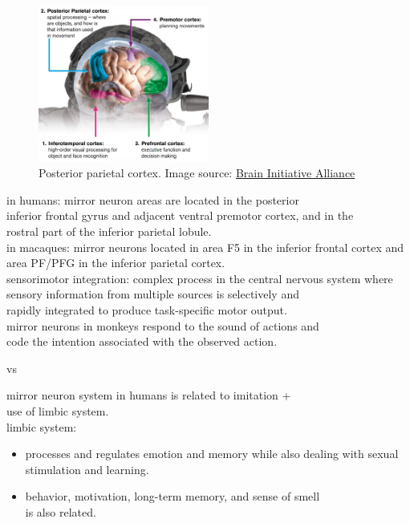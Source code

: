 \documentclass[12pt]{article}
\begin{document}
\begin{figure}[ht]
    \centering
    \includegraphics[width=0.5\textwidth]{brain2.png} %
    \caption{Posterior parietal cortex. Image source: \href{https://www.braininitiative.org/wp-content/uploads/2017/08/Posterior-Parietal-Cortex-170726.jpg}{Brain Initiative Alliance}}
    \label{fig:post}
\end{figure}

\noindent in humans: mirror neuron areas are located in the posterior\\inferior frontal gyrus and adjacent ventral premotor cortex, and in the\\rostral part of the inferior parietal lobule.\\

\noindent in macaques: mirror neurons located in area F5 in the inferior frontal cortex and area PF/PFG in the inferior parietal cortex.\\

\noindent sensorimotor integration: complex process in the central nervous system where sensory information from multiple sources is selectively and\\rapidly integrated to produce task-specific motor output.\\

\noindent mirror neurons in monkeys respond to the sound of actions and\\code the intention associated with the observed action.

vs

\noindent mirror neuron system in humans is related to imitation +\\use of limbic system.\\

limbic system:

\begin{itemize}
    \item processes and regulates emotion and memory while also dealing with sexual stimulation and learning.
    \item behavior, motivation, long-term memory, and sense of smell\\is also related.
\end{itemize}
\end{document}
